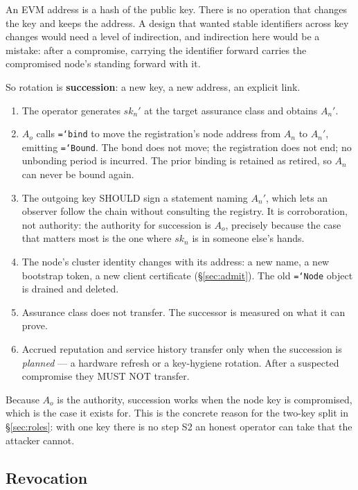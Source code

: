 \documentclass[11pt,a4paper]{article}
\newcommand{\code}[1]{\texttt{\hyphenchar\font=`\-\relax #1}}
\begin{document}
An EVM address is a hash of the public key. There is no operation that changes the
key and keeps the address. A design that wanted stable identifiers across key
changes would need a level of indirection, and indirection here would be a
mistake: after a compromise, carrying the identifier forward carries the
compromised node's standing forward with it.

So rotation is \textbf{succession}: a new key, a new address, an explicit link.

\begin{enumerate}[label=\textbf{S\arabic*.},leftmargin=2.6em]
\item The operator generates $sk_n'$ at the target assurance class and obtains
  $A_n'$.
\item $A_o$ calls \code{bind} to move the registration's node address from $A_n$ to
  $A_n'$, emitting \code{Bound}. The bond does not move; the registration does not
  end; no unbonding period is incurred. The prior binding is retained as retired,
  so $A_n$ can never be bound again.
\item The outgoing key SHOULD sign a statement naming $A_n'$, which lets an
  observer follow the chain without consulting the registry. It is corroboration,
  not authority: the authority for succession is $A_o$, precisely because the case
  that matters most is the one where $sk_n$ is in someone else's hands.
\item The node's cluster identity changes with its address: a new name, a new
  bootstrap token, a new client certificate (\S\ref{sec:admit}). The old \code{Node}
  object is drained and deleted.
\item Assurance class does not transfer. The successor is measured on what it can
  prove.
\item Accrued reputation and service history transfer only when the succession is
  \emph{planned} --- a hardware refresh or a key-hygiene rotation. After a
  suspected compromise they MUST NOT transfer.
\end{enumerate}

Because $A_o$ is the authority, succession works when the node key is compromised,
which is the case it exists for. This is the concrete reason for the two-key split
in \S\ref{sec:roles}: with one key there is no step S2 an honest operator can take
that the attacker cannot.

\subsection{Revocation}
\end{document}
